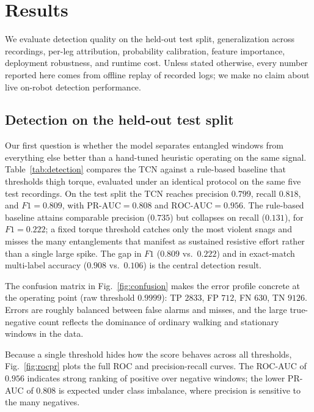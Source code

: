 \section{Results}

We evaluate detection quality on the held-out test split, generalization across recordings, per-leg attribution, probability calibration, feature importance, deployment robustness, and runtime cost. Unless stated otherwise, every number reported here comes from offline replay of recorded logs; we make no claim about live on-robot detection performance.

\subsection{Detection on the held-out test split}
Our first question is whether the model separates entangled windows from everything else better than a hand-tuned heuristic operating on the same signal. Table~\ref{tab:detection} compares the TCN against a rule-based baseline that thresholds thigh torque, evaluated under an identical protocol on the same five test recordings. On the test split the TCN reaches precision $0.799$, recall $0.818$, and $F1 = 0.809$, with $\text{PR-AUC} = 0.808$ and $\text{ROC-AUC} = 0.956$. The rule-based baseline attains comparable precision ($0.735$) but collapses on recall ($0.131$), for $F1 = 0.222$; a fixed torque threshold catches only the most violent snags and misses the many entanglements that manifest as sustained resistive effort rather than a single large spike. The gap in $F1$ ($0.809$ vs.\ $0.222$) and in exact-match multi-label accuracy ($0.908$ vs.\ $0.106$) is the central detection result.

The confusion matrix in Fig.~\ref{fig:confusion} makes the error profile concrete at the operating point (raw threshold $0.9999$): TP $2833$, FP $712$, FN $630$, TN $9126$. Errors are roughly balanced between false alarms and misses, and the large true-negative count reflects the dominance of ordinary walking and stationary windows in the data.

Because a single threshold hides how the score behaves across all thresholds, Fig.~\ref{fig:rocpr} plots the full ROC and precision-recall curves. The ROC-AUC of $0.956$ indicates strong ranking of positive over negative windows; the lower PR-AUC of $0.808$ is expected under class imbalance, where precision is sensitive to the many negatives.

